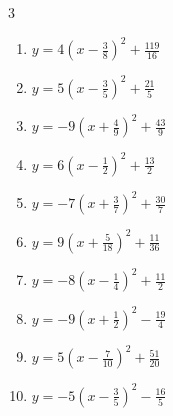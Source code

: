 \begin{multicols}{3}
\begin{enumerate}
  \item $\displaystyle y=4\left( x-\frac{3}{8}\right)^{2}+\frac{119}{16}$


  \item $\displaystyle y=5\left( x-\frac{3}{5}\right)^{2}+\frac{21}{5}$


  \item $\displaystyle y=-9\left( x+\frac{4}{9}\right)^{2}+\frac{43}{9}$


  \item $\displaystyle y=6\left( x-\frac{1}{2}\right)^{2}+\frac{13}{2}$


\columnbreak %

\resetques

  \item $\displaystyle y=-7\left( x+\frac{3}{7}\right)^{2}+\frac{30}{7}$


  \item $\displaystyle y=9\left( x+\frac{5}{18}\right)^{2}+\frac{11}{36}$


  \item $\displaystyle y=-8\left( x-\frac{1}{4}\right)^{2}+\frac{11}{2}$


  \item $\displaystyle y=-9\left( x+\frac{1}{2}\right)^{2}-\frac{19}{4}$


  \item $\displaystyle y=5\left( x-\frac{7}{10}\right)^{2}+\frac{51}{20}$


  \item $\displaystyle y=-5\left( x-\frac{3}{5}\right)^{2}-\frac{16}{5}$


\end{enumerate}
\end{multicols}
